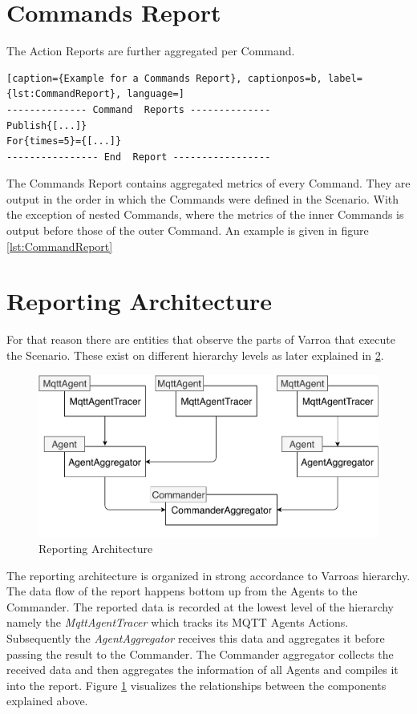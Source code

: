 \section{Commands Report}
The Action Reports are further aggregated per Command.
\\
\begin{lstlisting}[caption={Example for a Commands Report}, captionpos=b, label={lst:CommandReport}, language=]
-------------- Command  Reports --------------
Publish{[...]}
For{times=5}={[...]}
---------------- End  Report -----------------
\end{lstlisting}
The Commands Report contains aggregated metrics of every Command.
They are output in the order in which the Commands were defined in the Scenario.
With the exception of nested Commands, where the metrics of the inner Commands is output before those of the outer Command.
An example is given in figure \ref{lst:CommandReport}

\section{Reporting Architecture}\label{sec:ReportingArchitecture}
For that reason there are entities that observe the parts of Varroa that execute the Scenario.
These exist on different hierarchy levels as later explained in \ref{sec:ReportingArchitecture}. %

\begin{figure}[H]
	\begin{center}
		\includegraphics[scale=0.75]{Resources/PDF/ReportingArchitecture}
		\caption{Reporting Architecture}
		\label{fig:ReportingArchitecture}
	\end{center}
\end{figure}
The reporting architecture is organized in strong accordance to Varroas hierarchy.
The data flow of the report happens bottom up from the Agents to the Commander.
The reported data is recorded at the lowest level of the hierarchy namely the \emph{MqttAgentTracer} which tracks its MQTT Agents Actions.
Subsequently the \emph{AgentAggregator} receives this data and aggregates it before passing the result to the Commander.
The Commander aggregator collects the received data and then aggregates the information of all Agents and compiles it into the report.
Figure \ref{fig:ReportingArchitecture} visualizes the relationships between the components explained above.

